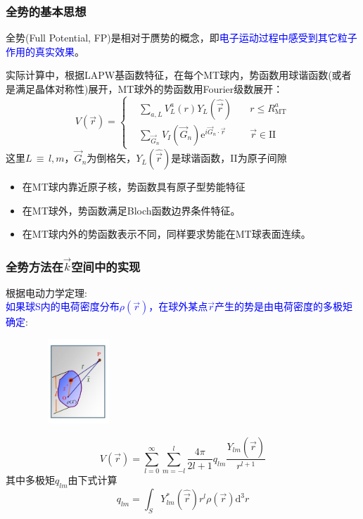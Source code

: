 \documentclass[cjk,slidestop,compress,mathserif,blue]{beamer}
\newcommand{\upcite}[1]{\hspace{0ex}\textsuperscript{\cite{#1}}} %
\begin{document}
\frame
{
\frametitle{全势的基本思想}
全势\textrm{(Full Potential, FP)}是相对于赝势的概念，即\textcolor{blue}{电子运动过程中感受到其它粒子作用的真实效果}。

实际计算中，根据\textrm{LAPW}基函数特征，在每个\textrm{MT}球内，势函数用球谐函数(或者是满足晶体对称性)展开，\textrm{MT}球外的势函数用\textrm{Fourier}级数展开：%
{\footnotesize$$ V(\vec r)=\left\{
  \begin{aligned}
    &\sum_{a,L}V_L^a(r)Y_L(\hat{\vec r})\quad &r\leqslant R_{\mathrm{MT}}^a\\
    &\sum_{\vec G_n}V_I(\vec G_n)\textrm{e}^{i\vec G_n\cdot\vec r} &\vec r\in\mathrm{II}
  \end{aligned}\right.
  \label{eq:solid-63}
$$}
这里$L$\,$\equiv$\,$l,m$，$\vec G_n$为倒格矢，$Y_L(\hat{\vec r})$是球谐函数，\textrm{II}为原子间隙
\begin{itemize}
	\item 在\textrm{MT}球内靠近原子核，势函数具有原子型势能特征
	\item 在\textrm{MT}球外，势函数满足\textrm{Bloch}函数边界条件特征。
	\item 在\textrm{MT}球内外的势函数表示不同，同样要求势能在\textrm{MT}球表面连续。
\end{itemize}
}

\frame
{
\frametitle{全势方法在$\vec k$空间中的实现}
根据电动力学定理:\\\textcolor{blue}{如果球\textrm{S}内的电荷密度分布$\rho(\vec r)$，在球外某点$\vec r$产生的势是由电荷密度的多极矩确定}:
\begin{figure}[h!]
\vspace*{-15pt}
\centering
\includegraphics[height=1.25in,width=1.32in,viewport=1 22 507 575,clip]{Figures/potential_multipole.jpg}
\label{Potential-multipole}
\end{figure}
\begin{displaymath}
	V(\vec r)=\sum_{l=0}^{\infty}\sum_{m=-l}^{l}\dfrac{4\pi}{2l+1}q_{lm}\dfrac{Y_{lm}(\hat{\vec r})}{r^{l+1}}
\end{displaymath}
其中多极矩$q_{lm}$由下式计算
\begin{displaymath}
	q_{lm}=\int_SY_{lm}^{\ast}(\hat{\vec r})r^l\rho(\vec r)\mathrm{d}^3r
\end{displaymath}
}
\end{document}
